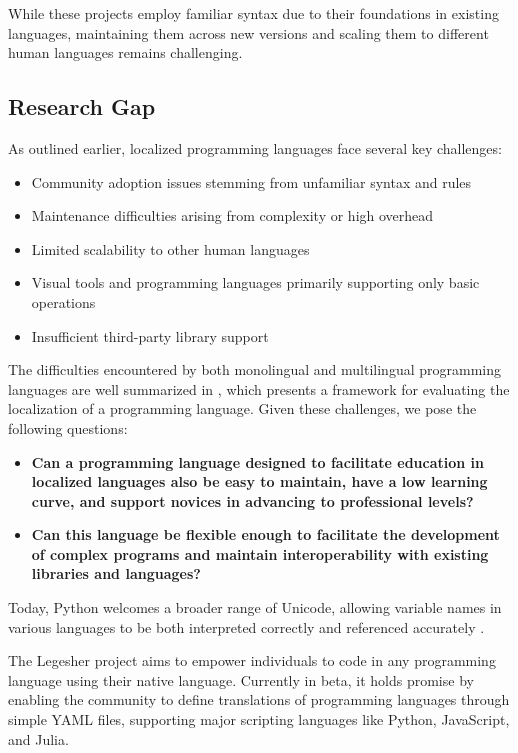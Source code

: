 \documentclass[conference]{IEEEtran}
\begin{document}
While these projects employ familiar syntax due to their foundations in existing languages, maintaining them across new versions and scaling them to different human languages remains challenging.

\subsection{Research Gap}

As outlined earlier, localized programming languages face several key challenges:

\begin{itemize}
\item Community adoption issues stemming from unfamiliar syntax and rules
\item Maintenance difficulties arising from complexity or high overhead
\item Limited scalability to other human languages
\item Visual tools and programming languages primarily supporting only basic operations
\item Insufficient third-party library support
\end{itemize}

The difficulties encountered by both monolingual and multilingual programming languages are well summarized in \cite{swidan2023framework}, which presents a framework for evaluating the localization of a programming language. Given these challenges, we pose the following questions:

\begin{itemize}
  \item \textbf{Can a programming language designed to facilitate education in localized languages also be easy to maintain, have a low learning curve, and support novices in advancing to professional levels?}
  
  \item \textbf{Can this language be flexible enough to facilitate the development of complex programs and maintain interoperability with existing libraries and languages?}
\end{itemize}

Today, Python welcomes a broader range of Unicode, allowing variable names in various languages to be both interpreted correctly and referenced accurately \cite{coghlan2014transition}.

The Legesher \cite{legesher} project aims to empower individuals to code in any programming language using their native language. Currently in beta, it holds promise by enabling the community to define translations of programming languages through simple YAML files, supporting major scripting languages like Python, JavaScript, and Julia.
\end{document}
